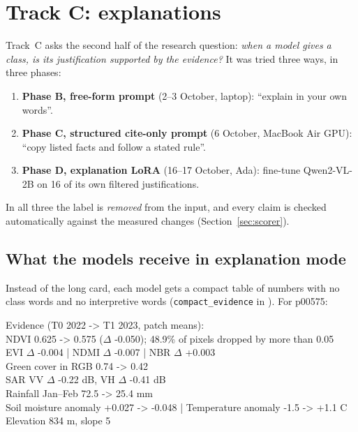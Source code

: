 \chapter{Track C: explanations}
\label{ch:trackC}

Track~C asks the second half of the research question: \emph{when a model gives a class, is its justification supported by the evidence?} It was tried three ways, in three phases:

\begin{enumerate}
  \item \textbf{Phase B, free-form prompt} (2--3 October, laptop): ``explain in your own words''.
  \item \textbf{Phase C, structured cite-only prompt} (6 October, MacBook Air GPU): ``copy listed facts and follow a stated rule''.
  \item \textbf{Phase D, explanation LoRA} (16--17 October, Ada): fine-tune Qwen2-VL-2B on 16 of its own filtered justifications.
\end{enumerate}

In all three the label is \emph{removed} from the input, and every claim is checked automatically against the measured changes (Section~\ref{sec:scorer}).

\section{What the models receive in explanation mode}

Instead of the long card, each model gets a compact table of numbers with no class words and no interpretive words (\texttt{compact\_evidence} in ). For p00575:

\begin{tcolorbox}[colback=gray!4,colframe=gray!50,fontupper=\scriptsize\ttfamily]
Evidence (T0 2022 -> T1 2023, patch means):\\
NDVI 0.625 -> 0.575 ($\Delta$ -0.050); 48.9\% of pixels dropped by more than 0.05\\
EVI $\Delta$ -0.004 | NDMI $\Delta$ -0.007 | NBR $\Delta$ +0.003\\
Green cover in RGB 0.74 -> 0.42\\
SAR VV $\Delta$ -0.22 dB, VH $\Delta$ -0.41 dB\\
Rainfall Jan--Feb 72.5 -> 25.4 mm\\
Soil moisture anomaly +0.027 -> -0.048 | Temperature anomaly -1.5 -> +1.1 \textdegree C\\
Elevation 834 m, slope 5\textdegree
\end{tcolorbox}

